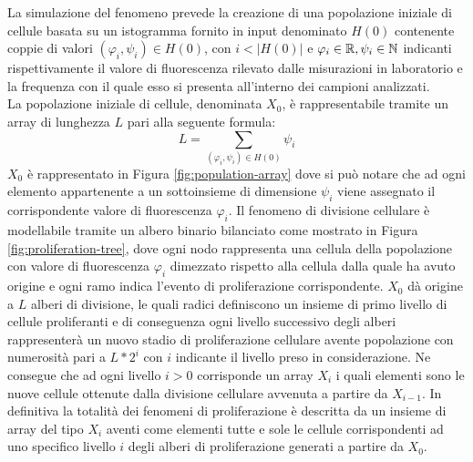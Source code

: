 La simulazione del fenomeno prevede la creazione di una popolazione iniziale
di cellule basata su un istogramma fornito in input denominato $H(0)$
contenente coppie di valori $(\varphi_{i}, \psi_{i}) \in H(0)$,
con $i < |H(0)|$ e $\varphi_{i} \in \mathbb{R}, \psi_{i} \in \mathbb{N}$
indicanti rispettivamente il
valore di fluorescenza rilevato dalle misurazioni in laboratorio e
la frequenza con il quale esso si presenta all'interno dei campioni analizzati.
\\
La popolazione iniziale di cellule, denominata $X_{0}$, è rappresentabile
tramite un array di
lunghezza $L$ pari alla seguente formula: 
$$L = \sum_{(\varphi_{i}, \psi_{i}) \in H(0)} \psi_{i}$$
$X_{0}$ è rappresentato in Figura \ref{fig:population-array} dove si
può notare che ad ogni elemento
appartenente a un sottoinsieme di dimensione $\psi_{i}$ viene assegnato il corrispondente
valore di fluorescenza $\varphi_{i}$.
Il fenomeno di divisione cellulare è modellabile tramite un albero binario 
bilanciato
come mostrato in Figura \ref{fig:proliferation-tree}, dove ogni nodo rappresenta
una cellula della popolazione con valore di fluorescenza $\varphi_{i}$
dimezzato rispetto alla cellula dalla quale ha avuto origine e ogni
ramo indica l'evento di proliferazione corrispondente.
$X_{0}$ dà origine a $L$ alberi di
divisione, le quali radici definiscono un insieme di primo livello di cellule
proliferanti e di conseguenza ogni livello successivo degli alberi rappresenterà
un nuovo stadio di proliferazione cellulare avente popolazione con numerosità
pari a $L * 2^{i}$ con $i$ indicante il livello preso in considerazione.
Ne consegue che ad ogni livello $i > 0$ corrisponde un array $X_{i}$ i quali
elementi sono le nuove cellule ottenute dalla divisione cellulare avvenuta a 
partire da $X_{i-1}$.
In definitiva la totalità dei fenomeni di proliferazione è descritta da un
insieme di array del tipo $X_{i}$ aventi come elementi tutte e sole le cellule
corrispondenti ad uno specifico livello $i$ degli alberi di proliferazione
generati a partire da $X_{0}$.

